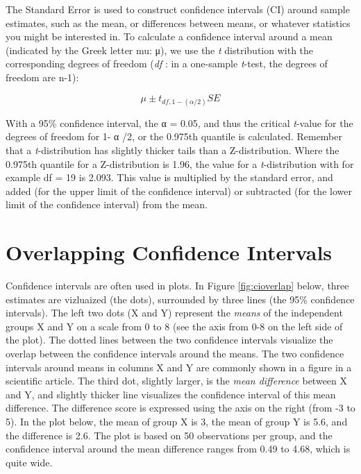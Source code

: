 \documentclass[
]{krantz}
\begin{document}
The Standard Error is used to construct confidence intervals (CI) around sample estimates, such as the mean, or differences between means, or whatever statistics you might be interested in. To calculate a confidence interval around a mean (indicated by the Greek letter mu: μ), we use the \emph{t} distribution with the corresponding degrees of freedom (\emph{df} : in a one-sample \emph{t}-test, the degrees of freedom are n-1):

\[
\mu \pm t_{df, 1-(\alpha/2)} SE
\]

With a 95\% confidence interval, the α = 0.05, and thus the critical \emph{t}-value for the degrees of freedom for 1- α /2, or the 0.975th quantile is calculated. Remember that a \emph{t}-distribution has slightly thicker tails than a Z-distribution. Where the 0.975th quantile for a Z-distribution is 1.96, the value for a \emph{t}-distribution with for example df = 19 is 2.093. This value is multiplied by the standard error, and added (for the upper limit of the confidence interval) or subtracted (for the lower limit of the confidence interval) from the mean.

\hypertarget{overlapping-confidence-intervals}{%
\section{Overlapping Confidence Intervals}\label{overlapping-confidence-intervals}}

Confidence intervals are often used in plots. In Figure \ref{fig:cioverlap} below, three estimates are vizluaized (the dots), surrounded by three lines (the 95\% confidence intervals). The left two dots (X and Y) represent the \emph{means} of the independent groups X and Y on a scale from 0 to 8 (see the axis from 0-8 on the left side of the plot). The dotted lines between the two confidence intervals visualize the overlap between the confidence intervals around the means. The two confidence intervals around means in columns X and Y are commonly shown in a figure in a scientific article. The third dot, slightly larger, is the \emph{mean difference} between X and Y, and slightly thicker line visualizes the confidence interval of this mean difference. The difference score is expressed using the axis on the right (from -3 to 5). In the plot below, the mean of group X is 3, the mean of group Y is 5.6, and the difference is 2.6. The plot is based on 50 observations per group, and the confidence interval around the mean difference ranges from 0.49 to 4.68, which is quite wide.
\end{document}
